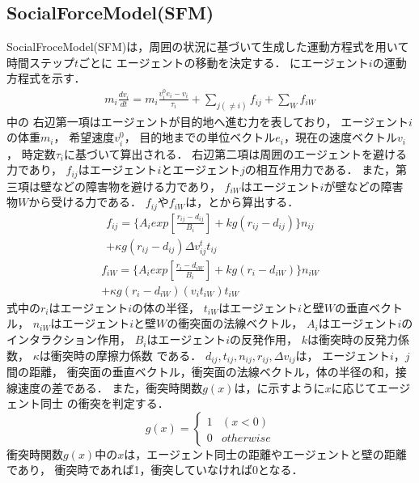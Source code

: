 \subsection{SocialForceModel(SFM)}
SocialFroceModel(SFM)は，周囲の状況に基づいて生成した運動方程式を用いて時間ステップ$t$ごとに
エージェントの移動を決定する．
にエージェント$i$の運動方程式を示す．
%
\begin{eqnarray}
  m_i \frac{dv_i}{dt} = m_i \frac{v_i^0 e_i - v_i}{\tau_i}
  +\sum_{j(\neq i)}f_{ij}+\sum_{W}f_{iW}
  \label{eq:sfm_siki1}
\end{eqnarray}
%
中の
右辺第一項はエージェントが目的地へ進む力を表しており，
エージェント$i$の体重$m_i$，
希望速度$v_i^0$，
目的地までの単位ベクトル$e_i$，現在の速度ベクトル$v_i$，
時定数$\tau_i$に基づいて算出される．
右辺第二項は周囲のエージェントを避ける力であり，
$f_{ij}$はエージェント$i$とエージェント$j$の相互作用力である．
また，第三項は壁などの障害物を避ける力であり，
$f_{iW}$はエージェント$i$が壁などの障害物$W$から受ける力である．
$f_{ij}$や$f_{iW}$は，とから算出する．
%
\begin{eqnarray}
  f_{ij} =  \{A_i exp [\frac{r_{ij} - d_{ij}}{B_i}  ]
  + kg(r_{ij} - d_{ij})\} n_{ij} \\ \nonumber
  + \kappa g (r_{ij} - d_{ij}) \Delta
  v^t_{ij} t_{ij}
  \label{eq:sfm_siki2}
\end{eqnarray}
%
\begin{eqnarray}
  f_{iW} = \{A_i exp[\frac{r_{i} - d_{iW}}{B_i}]
  + kg(r_{i} - d_{iW})\} n_{iW} \\ \nonumber
  + \kappa g (r_{i} - d_{iW}) (v_i t_{iW}) t_{iW}
  \label{eq:sfm_siki3}
\end{eqnarray}
%
式中の$r_i$はエージェント$i$の体の半径，
$t_{iW}$はエージェント$i$と壁$W$の垂直ベクトル，
$n_{iW}$はエージェント$i$と壁$W$の衝突面の法線ベクトル，
$A_i$はエージェント$i$のインタラクション作用，
$B_i$はエージェント$i$の反発作用，
$k$は衝突時の反発力係数，
$\kappa$は衝突時の摩擦力係数
である．
$d_{ij}, t_{ij}, n_{ij}, r_{ij}, \Delta v_{ij}$は，
エージェント$i$，$j$間の距離，
衝突面の垂直ベクトル，衝突面の法線ベクトル，体の半径の和，接線速度の差である．
また，衝突時関数$g(x)$は，に示すように$x$に応じてエージェント同士
の衝突を判定する．
%
\begin{equation}
  \label{eq:gx_siki}
  g(x) =
  \begin{cases}
    1 & (x<0)     \\
    0 & otherwise
  \end{cases}
\end{equation}
%
衝突時関数$g(x)$中の$x$は，エージェント同士の距離やエージェントと壁の距離であり，
衝突時であれば1，衝突していなければ0となる．




